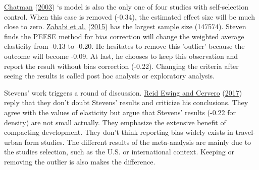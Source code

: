 \documentclass[
  12pt,
]{article}
\begin{document}
\protect\hyperlink{ref-chatmanHowDensityMixed2003}{Chatman} (\protect\hyperlink{ref-chatmanHowDensityMixed2003}{2003}) `s model is also the only one of four studies with self-selection control. When this case is removed (-0.34), the estimated effect size will be much close to zero. \protect\hyperlink{ref-zahabiSpatiotemporalAnalysisCar2015}{Zahabi et al.} (\protect\hyperlink{ref-zahabiSpatiotemporalAnalysisCar2015}{2015}) has the largest sample size (147574). Steven finds the PEESE method for bias correction will change the weighted average elasticity from -0.13 to -0.20. He hesitates to remove this 'outlier' because the outcome will become -0.09. At last, he chooses to keep this observation and report the result without bias correction (-0.22). Changing the criteria after seeing the results is called post hoc analysis or exploratory analysis.

Stevens' work triggers a round of discussion. \protect\hyperlink{ref-ewingDoesCompactDevelopment2017}{Reid Ewing and Cervero} (\protect\hyperlink{ref-ewingDoesCompactDevelopment2017}{2017}) reply that they don't doubt Stevens' results and criticize his conclusions. They agree with the values of elasticity but argue that Stevens' results (-0.22 for density) are not small actually. They emphasize the extensive benefit of compacting development. They don't think reporting bias widely exists in travel-urban form studies. The different results of the meta-analysis are mainly due to the studies selection, such as the U.S. or international context. Keeping or removing the outlier is also makes the difference.
\end{document}
